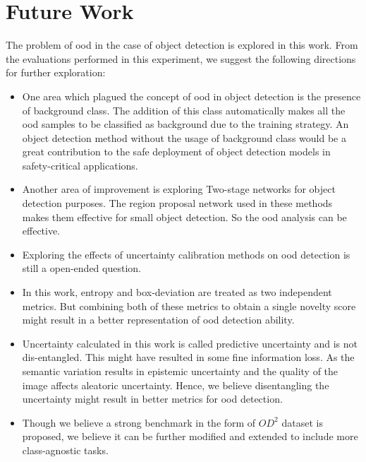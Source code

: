     \section{Future Work}
    The problem of \acrshort{ood} in the case of object detection is explored in this work. From the evaluations performed in this experiment, we suggest the following directions for further exploration:
    \begin{itemize}
        \item One area which plagued the concept of \acrshort{ood} in object detection is the presence of background class. The addition of this class automatically makes all the \acrshort{ood} samples to be classified as background due to the training strategy. An object detection method without the usage of background class would be a great contribution to the safe deployment of object detection models in safety-critical applications.
        \item Another area of improvement is exploring Two-stage networks for object detection purposes. The region proposal network used in these methods makes them effective for small object detection. So the \acrshort{ood} analysis can be effective.
        \item Exploring the effects of uncertainty calibration methods \cite{GuoCalibration2017} on \acrshort{ood} detection is still a open-ended question.
        \item In this work, entropy and box-deviation are treated as two independent metrics. But combining both of these metrics to obtain a single novelty score might result in a better representation of \acrshort{ood} detection ability.
        \item Uncertainty calculated in this work is called predictive uncertainty and is not dis-entangled. This might have resulted in some fine information loss. As the semantic variation results in epistemic uncertainty and the quality of the image affects aleatoric uncertainty. Hence, we believe disentangling the uncertainty might result in better metrics for \acrshort{ood} detection. 
        \item Though we believe a strong benchmark in the form of $OD^2$ dataset is proposed, we believe it can be further modified and extended to include more class-agnostic tasks.
    \end{itemize}

